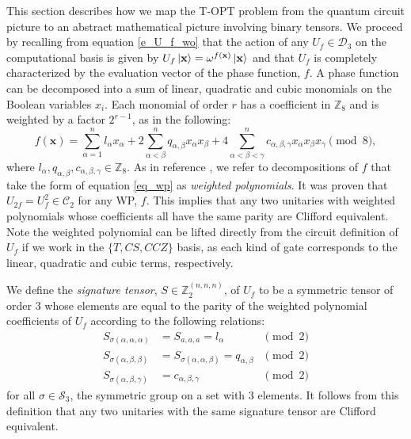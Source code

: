 \documentclass[notitlepage]{article}
\theoremstyle{definition}
\newtheorem{definition}{Definition}[section]
\theoremstyle{problem}
\theoremstyle{lemma}
\begin{document}
This section describes how we map the T-OPT problem from the quantum circuit picture to an abstract mathematical picture involving binary tensors. We proceed by recalling from equation \ref{e_U_f_wo} that the action of any $U_f\in \mathcal{D}_3$ on the computational basis is given by $U_f \left\vert{\mathbf{x}}\right\rangle = \omega^{f(\mathbf{x})}\left\vert{\mathbf{x}}\right\rangle$ and that $U_f$ is completely characterized by the evaluation vector of the phase function, $f$. A phase function can be decomposed into a sum of linear, quadratic and cubic monomials on the Boolean variables $x_i$. Each monomial of order $r$ has a coefficient in $\mathbb{Z}_8$ and is weighted by a factor $2^{r-1}$, as in the following:
\begin{equation}
\label{eq_wp}
f(\mathbf{x}) = \sum_{\alpha=1}^{n}l_{\alpha}x_\alpha + 2\sum_{\alpha<\beta}^{n} q_{\alpha,\beta}x_\alpha x_\beta + 4\sum_{\alpha<\beta<\gamma}^{n}c_{\alpha,\beta,\gamma}x_\alpha x_\beta x_\gamma \pmod{8},
\end{equation}
where $l_{\alpha},q_{\alpha,\beta},c_{\alpha,\beta,\gamma} \in \mathbb{Z}_8$.
As in reference \cite{4_Campbell_2017}, we refer to decompositions of $f$ that take the form of equation \ref{eq_wp} as \emph{weighted polynomials}.
It was proven that $U_{2f}=U_f^2 \in \mathcal{C}_2$ for any WP, $f$. 
This implies that any two unitaries with weighted polynomials whose coefficients all have the same parity are Clifford equivalent. Note the weighted polynomial can be lifted directly from the circuit definition of $U_f$ if we work in the $\{T, CS, CCZ\}$ basis, as each kind of gate corresponds to the linear, quadratic and cubic terms, respectively.

We define the \emph{signature tensor}, $S \in \mathbb{Z}_2^{(n,n,n)}$, of $U_f$ to be a symmetric tensor of order 3 whose elements are equal to the parity of the weighted polynomial coefficients of $U_f$ according to the following relations:
\begin{subequations}
	\label{eq_def_sig}
	\begin{align} 
	S_{\sigma(\alpha,\alpha,\alpha)}& = S_{a,a,a} = l_{\alpha} &\pmod{2} \label{e_def_sig_1}\\
	S_{\sigma(\alpha,\beta,\beta)}& = S_{\sigma(\alpha,\alpha,\beta)} = q_{\alpha,\beta} &\pmod{2} \label{e_def_sig_2}\\
	S_{\sigma(\alpha,\beta,\gamma)}& = c_{\alpha,\beta,\gamma} &\pmod{2} \label{e_def_sig_3}
	\end{align}
\end{subequations}
for all $\sigma \in \mathcal{S}_3$, the symmetric group on a set with 3 elements. It follows from this definition that any two unitaries with the same signature tensor are Clifford equivalent.
\end{document}
